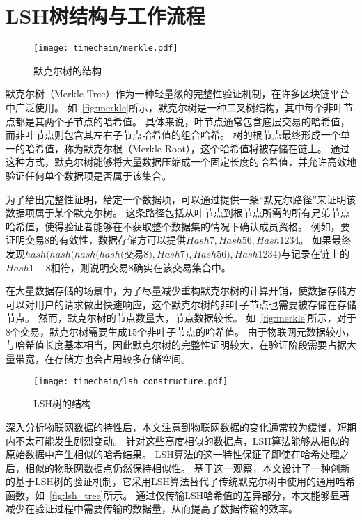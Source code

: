 \section{LSH树结构与工作流程}

\begin{figure}[t]
    \centering
    \texttt{[image: timechain/merkle.pdf]}
    \caption{默克尔树的结构}
    \label{fig:merkle}
\end{figure}

默克尔树（Merkle Tree）作为一种轻量级的完整性验证机制，在许多区块链平台中广泛使用。
如~\autoref{fig:merkle}所示，默克尔树是一种二叉树结构，其中每个非叶节点都是其两个子节点的哈希值。
具体来说，叶节点通常包含底层交易的哈希值，而非叶节点则包含其左右子节点哈希值的组合哈希。
树的根节点最终形成一个单一的哈希值，称为默克尔根（Merkle Root），这个哈希值将被存储在链上。
通过这种方式，默克尔树能够将大量数据压缩成一个固定长度的哈希值，并允许高效地验证任何单个数据项是否属于该集合。

为了给出完整性证明，给定一个数据项，可以通过提供一条“默克尔路径”来证明该数据项属于某个默克尔树。
这条路径包括从叶节点到根节点所需的所有兄弟节点哈希值，使得验证者能够在不获取整个数据集的情况下确认成员资格。
例如，要证明交易8的有效性，数据存储方可以提供$Hash7, Hash56, Hash1234$。
如果最终发现$hash(hash(hash(hash($交易8$),Hash7),Hash56),Hash1234)$与记录在链上的$Hash1-8$相符，则说明交易8确实在该交易集合中。

在大量数据存储的场景中，为了尽量减少重构默克尔树的计算开销，使数据存储方可以对用户的请求做出快速响应，这个默克尔树的非叶子节点也需要被存储在存储节点。
然而，默克尔树的节点数量大，节点数据较长。
如~\autoref{fig:merkle}所示，对于8个交易，默克尔树需要生成15个非叶子节点的哈希值。
由于物联网元数据较小，与哈希值长度基本相当，因此默克尔树的完整性证明较大，在验证阶段需要占据大量带宽，在存储方也会占用较多存储空间。

\begin{figure}[t]
    \centering
    \texttt{[image: timechain/lsh\_constructure.pdf]}
    \caption{LSH树的结构}
    \label{fig:lsh_tree}
\end{figure}

深入分析物联网数据的特性后，本文注意到物联网数据的变化通常较为缓慢，短期内不太可能发生剧烈变动。
针对这些高度相似的数据点，LSH算法能够从相似的原始数据中产生相似的哈希结果。
LSH算法的这一特性保证了即使在哈希处理之后，相似的物联网数据点仍然保持相似性。
基于这一观察，本文设计了一种创新的基于LSH树的验证机制，它采用LSH算法替代了传统默克尔树中使用的通用哈希函数，如~\autoref{fig:lsh_tree}所示。
通过仅传输LSH哈希值的差异部分，本文能够显著减少在验证过程中需要传输的数据量，从而提高了数据传输的效率。

